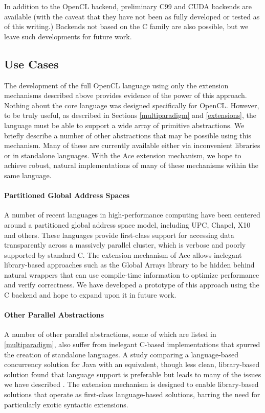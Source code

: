 \documentclass[10pt, conference, compsocconf]{IEEEtran}
\begin{document}
In addition to the OpenCL backend, preliminary C99 and CUDA backends are available (with the caveat that they have not been as fully developed or tested as of this writing.) Backends not based on the C family are also possible, but we leave such developments for future work.

\subsection{Use Cases}
The development of the full OpenCL language using only the extension mechanisms described above provides evidence of the power of this approach. Nothing about the core language was designed specifically for OpenCL. However, to be truly useful, as described in Sections \ref{multiparadigm} and  \ref{extensions}, the language must be able to support a wide array of primitive abstractions. We briefly describe a number of other abstractions that may be possible using this mechanism. Many of these are currently available either via inconvenient libraries or in standalone languages. With the Ace extension mechanism, we hope to achieve robust, natural implementations of many of these mechanisms within the same language.

\paragraph{Partitioned Global Address Spaces}
A number of recent languages in high-performance computing have been centered around a partitioned global address space model, including UPC, Chapel, X10 and others. These languages provide first-class support for accessing data transparently across a massively parallel cluster, which is verbose and poorly supported by standard C. The extension mechanism of Ace allows inelegant library-based approaches such as the Global Arrays library to be hidden behind natural wrappers that can use compile-time information to optimize performance and verify correctness. We have developed a prototype of this approach using the C backend and hope to expand upon it in future work.

\paragraph{Other Parallel Abstractions}
A number of other parallel abstractions, some of which are listed in \ref{multiparadigm}, also suffer from inelegant C-based implementations that spurred the creation of standalone languages. A study comparing a language-based concurrency solution for Java with an equivalent, though less clean, library-based solution found that language support is preferable but leads to many of the issues we have described \cite{cave2010comparing}. The extension mechanism is designed to enable library-based solutions that operate as first-class language-based solutions, barring the need for particularly exotic syntactic extensions.
\end{document}
